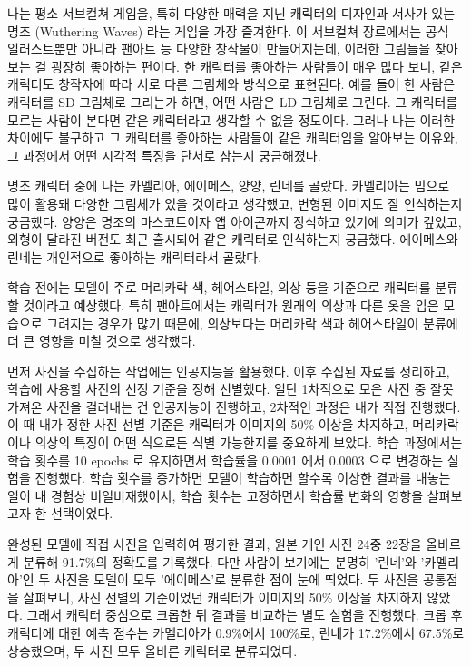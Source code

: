 \documentclass[11pt]{article}
\begin{document}
\makeheader


나는 평소 서브컬쳐 게임을, 특히 다양한 매력을 지닌 캐릭터의 디자인과 서사가 있는 명조 (Wuthering Waves) 라는 게임을 가장 즐겨한다. 이 서브컬쳐 장르에서는 공식 일러스트뿐만 아니라 팬아트 등 다양한 창작물이 만들어지는데, 이러한 그림들을 찾아 보는 걸 굉장히 좋아하는 편이다. 한 캐릭터를 좋아하는 사람들이 매우 많다 보니, 같은 캐릭터도 창작자에 따라 서로 다른 그림체와 방식으로 표현된다. 예를 들어 한 사람은 캐릭터를 SD 그림체로 그리는가 하면, 어떤 사람은 LD 그림체로 그린다. 그 캐릭터를 모르는 사람이 본다면 같은 캐릭터라고 생각할 수 없을 정도이다. 그러나 나는 이러한 차이에도 불구하고 그 캐릭터를 좋아하는 사람들이 같은 캐릭터임을 알아보는 이유와, 그 과정에서 어떤 시각적 특징을 단서로 삼는지 궁금해졌다.

명조 캐릭터 중에 나는 카멜리아, 에이메스, 양양, 린네를 골랐다. 카멜리아는 밈으로 많이 활용돼 다양한 그림체가 있을 것이라고 생각했고, 변형된 이미지도 잘 인식하는지 궁금했다. 양양은 명조의 마스코트이자 앱 아이콘까지 장식하고 있기에 의미가 깊었고, 외형이 달라진 버전도 최근 출시되어 같은 캐릭터로 인식하는지 궁금했다. 에이메스와 린네는 개인적으로 좋아하는 캐릭터라서 골랐다.

학습 전에는 모델이 주로 머리카락 색, 헤어스타일, 의상 등을 기준으로 캐릭터를 분류할 것이라고 예상했다. 특히 팬아트에서는 캐릭터가 원래의 의상과 다른 옷을 입은 모습으로 그려지는 경우가 많기 때문에, 의상보다는 머리카락 색과 헤어스타일이 분류에 더 큰 영향을 미칠 것으로 생각했다.

먼저 사진을 수집하는 작업에는 인공지능을 활용했다. 이후 수집된 자료를 정리하고, 학습에 사용할 사진의 선정 기준을 정해 선별했다. 일단 1차적으로 모은 사진 중 잘못 가져온 사진을 걸러내는 건 인공지능이 진행하고, 2차적인 과정은 내가 직접 진행했다. 이 때 내가 정한 사진 선별 기준은 캐릭터가 이미지의 50\% 이상을 차지하고, 머리카락이나 의상의 특징이 어떤 식으로든 식별 가능한지를 중요하게 보았다. 학습 과정에서는 학습 횟수를 10 epochs 로 유지하면서 학습률을 0.0001 에서  0.0003 으로 변경하는 실험을 진행했다. 학습 횟수를 증가하면 모델이 학습하면 할수록 이상한 결과를 내놓는 일이 내 경험상 비일비재했어서, 학습 횟수는 고정하면서 학습률 변화의 영향을 살펴보고자 한 선택이었다.

완성된 모델에 직접 사진을 입력하여 평가한 결과, 원본 개인 사진 24중 22장을 올바르게 분류해 91.7\%의 정확도를 기록했다. 다만 사람이 보기에는 분명히 '린네'와 '카멜리아'인 두 사진을 모델이 모두 '에이메스'로 분류한 점이 눈에 띄었다. 두 사진을 공통점을 살펴보니, 사진 선별의 기준이었던 캐릭터가 이미지의 50\% 이상을 차지하지 않았다. 그래서 캐릭터 중심으로 크롭한 뒤 결과를 비교하는 별도 실험을 진행했다. 크롭 후 캐릭터에 대한 예측 점수는 카멜리아가 0.9\%에서 100\%로, 린네가 17.2\%에서 67.5\%로 상승했으며, 두 사진 모두 올바른 캐릭터로 분류되었다.
\end{document}
